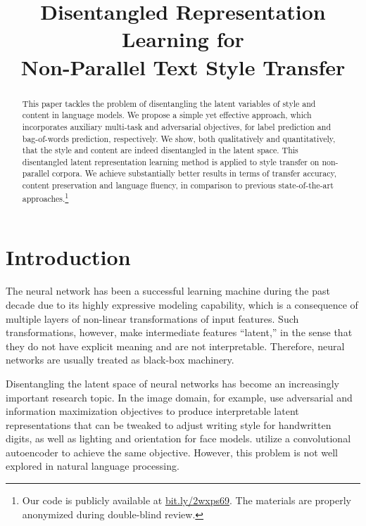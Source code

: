 \documentclass[letterpaper]{article} %
\title{Disentangled Representation Learning for\\Non-Parallel Text Style Transfer}
\date{}
\begin{document}
\maketitle
\graphicspath{{images/}}

\begin{abstract}
	This paper tackles the problem of disentangling the latent variables of style and content in language models.
	We propose a simple yet effective approach, which incorporates auxiliary multi-task and adversarial objectives, for label prediction and bag-of-words prediction, respectively.
	We show, both qualitatively and quantitatively, that the style and content are indeed disentangled in the latent space.
	This disentangled latent representation learning method is applied to style transfer on non-parallel corpora.
	We achieve substantially better results in terms of transfer accuracy, content preservation and language fluency, in comparison to previous state-of-the-art approaches.\footnote{Our code is publicly available at \url{bit.ly/2wxps69}. The materials are properly anonymized during double-blind review.}
\end{abstract}

% 


\section{Introduction}

The neural network has been a successful learning machine during the past decade due to its highly expressive modeling capability, which is a consequence of multiple layers of non-linear transformations of input features.
Such transformations, however, make intermediate features ``latent,'' in the sense that they do not have explicit meaning and are not interpretable.
Therefore, neural networks are usually treated as black-box machinery.

Disentangling the latent space of neural networks has become an increasingly important research topic.
In the image domain, for example, \citet{chen2016infogan} use adversarial and information maximization objectives to produce interpretable latent representations that can be tweaked to adjust writing style for handwritten digits, as well as lighting and orientation for face models.
\citet{mathieu2016disentangling} utilize a convolutional autoencoder to achieve the same objective.
However, this problem is not well explored in natural language processing.
\end{document}
